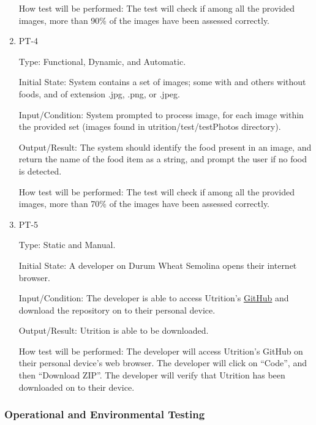 \documentclass[12pt, titlepage]{article}
\begin{document}
\begin{enumerate}
		How test will be performed: The test will check if among all the 
		provided images, more than 90\% of the images have been assessed 
		correctly.
		
		\item{PT-4}
		
		Type: Functional, Dynamic, and Automatic.
		
		Initial State: System contains a set of images; some with and others 
		without foods, and of extension .jpg, .png, or 
		.jpeg.
		
		Input/Condition: System prompted to process image, for each image 
		within the provided set (images found in utrition/test/testPhotos directory).
		
		Output/Result: The system should identify the food present in an image, 
		and return the name of the food item as a string, and prompt the user 
		if no food is detected.
		
		How test will be performed: The test will check if among all the 
		provided images, more than 70\% of the images have been assessed 
		correctly.
		
		\item{PT-5} 
		
		Type: Static and Manual.
		
		Initial State: A developer on Durum Wheat Semolina opens their internet browser.
		
		Input/Condition: The developer is able to access Utrition’s  \href{https://github.com/jeff-rey-wang/utrition}{GitHub} and download the repository on to their personal device.
		
		Output/Result: Utrition is able to be downloaded.
		
		How test will be performed: The developer will access Utrition’s GitHub on their personal device’s web browser. The developer will click on “Code”, and then “Download ZIP”. The developer will verify that Utrition has been downloaded on to their device.
		
	\end{enumerate}
	
	\subsubsection{Operational and Environmental Testing}
	
	
\end{document}
